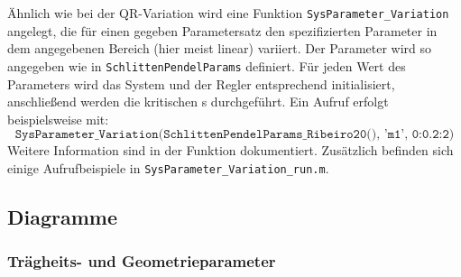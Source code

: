 Ähnlich wie bei der QR-Variation wird eine Funktion \texttt{SysParameter\_Variation} angelegt, die für einen gegeben Parametersatz den spezifizierten Parameter in dem angegebenen Bereich (hier meist linear) variiert.
Der Parameter wird so angegeben wie in \texttt{SchlittenPendelParams} definiert.
Für jeden Wert des Parameters wird das System und der Regler entsprechend initialisiert, anschließend werden die kritischen \xots s durchgeführt.
Ein Aufruf erfolgt beispielsweise mit:
	\[
	\texttt{SysParameter\_Variation(SchlittenPendelParams\_Ribeiro20(), 'm1', 0:0.2:2)}
\]
Weitere Information sind in der Funktion dokumentiert.
Zusätzlich befinden sich einige Aufrufbeispiele in \texttt{SysParameter\_Variation\_run.m}.



\subsection{Diagramme}

\subsubsection{Trägheits- und Geometrieparameter}

